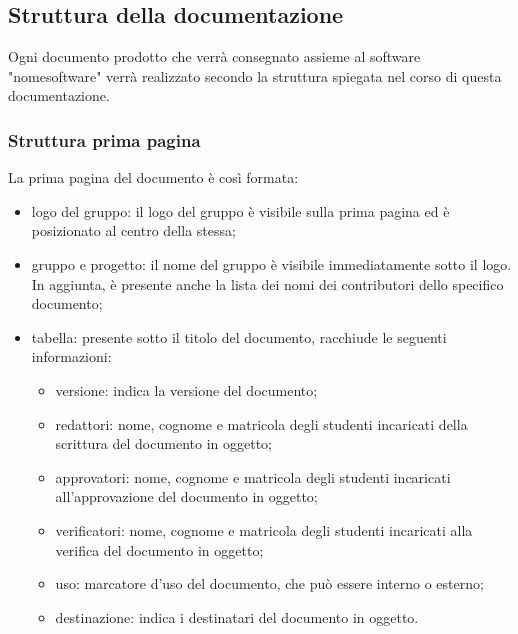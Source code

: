 \subsection{Struttura della documentazione}
Ogni documento prodotto che verrà consegnato assieme al software "nomesoftware" verrà realizzato secondo la struttura spiegata nel corso di questa documentazione.

\subsubsection{Struttura prima pagina}
La prima pagina del documento è così formata:
\begin{itemize}
	\item logo del gruppo: il logo del gruppo {\Gruppo} è visibile sulla prima pagina ed è posizionato al centro della stessa;
	\item gruppo e progetto: il nome del gruppo è visibile immediatamente sotto il logo. In aggiunta, è presente anche la lista dei nomi dei contributori dello specifico documento;
	\item tabella: presente sotto il titolo del documento, racchiude le seguenti informazioni:
	\begin{itemize}
		\item versione: indica la versione del documento;
		\item redattori: nome, cognome e matricola degli studenti incaricati della scrittura del documento in oggetto;
		\item approvatori: nome, cognome e matricola degli studenti incaricati all’approvazione del documento in oggetto;
		\item verificatori: nome, cognome e matricola degli studenti incaricati alla verifica del documento in oggetto;
		\item uso: marcatore d’uso del documento, che può essere interno o esterno;
		\item destinazione: indica i destinatari del documento in oggetto.
		\end{itemize}
	\end{itemize}
	
